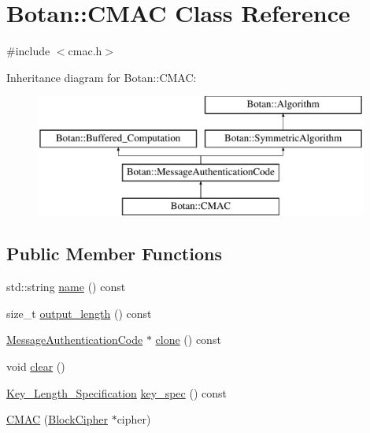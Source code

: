 \hypertarget{classBotan_1_1CMAC}{\section{Botan\-:\-:C\-M\-A\-C Class Reference}
\label{classBotan_1_1CMAC}
}


{\ttfamily \#include $<$cmac.\-h$>$}

Inheritance diagram for Botan\-:\-:C\-M\-A\-C\-:\begin{figure}[H]
\begin{center}
\leavevmode
\includegraphics[height=4.000000cm]{classBotan_1_1CMAC}
\end{center}
\end{figure}
\subsection*{Public Member Functions}
\begin{DoxyCompactItemize}
\item 
std\-::string \hyperlink{classBotan_1_1CMAC_a50ac5f7889034db2f20366ece8d3270e}{name} () const 
\item 
size\-\_\-t \hyperlink{classBotan_1_1CMAC_a7b1c90942eaf2559457adbc3bf21c8ca}{output\-\_\-length} () const 
\item 
\hyperlink{classBotan_1_1MessageAuthenticationCode}{Message\-Authentication\-Code} $\ast$ \hyperlink{classBotan_1_1CMAC_a379d3b431220b7372384f1447b153348}{clone} () const 
\item 
void \hyperlink{classBotan_1_1CMAC_a48ce1df790e649f8dd5126770b287839}{clear} ()
\item 
\hyperlink{classBotan_1_1Key__Length__Specification}{Key\-\_\-\-Length\-\_\-\-Specification} \hyperlink{classBotan_1_1CMAC_aed7b5ef72f5c709dc736786504ab7b6f}{key\-\_\-spec} () const 
\item 
\hyperlink{classBotan_1_1CMAC_ab4359eddcf8d7d84169eb2671abeaec7}{C\-M\-A\-C} (\hyperlink{classBotan_1_1BlockCipher}{Block\-Cipher} $\ast$cipher)
\end{DoxyCompactItemize}
